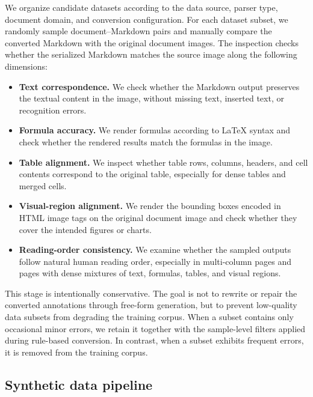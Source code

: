 We organize candidate datasets according to the data source, parser type, document domain, and conversion configuration. For each dataset subset, we randomly sample document--Markdown pairs and manually compare the converted Markdown with the original document images. The inspection checks whether the serialized Markdown matches the source image along the following dimensions:
\begin{itemize}
    \item \textbf{Text correspondence.}
    We check whether the Markdown output preserves the textual content in the image, without missing text, inserted text, or recognition errors.

    \item \textbf{Formula accuracy.}
    We render formulas according to LaTeX syntax and check whether the rendered results match the formulas in the image.

    \item \textbf{Table alignment.}
    We inspect whether table rows, columns, headers, and cell contents correspond to the original table, especially for dense tables and merged cells.

    \item \textbf{Visual-region alignment.}
    We render the bounding boxes encoded in HTML image tags on the original document image and check whether they cover the intended figures or charts.

    \item \textbf{Reading-order consistency.}
    We examine whether the sampled outputs follow natural human reading order, especially in multi-column pages and pages with dense mixtures of text, formulas, tables, and visual regions.
\end{itemize}

This stage is intentionally conservative. The goal is not to rewrite or repair the converted annotations through free-form generation, but to prevent low-quality data subsets from degrading the training corpus. When a subset contains only occasional minor errors, we retain it together with the sample-level filters applied during rule-based conversion. In contrast, when a subset exhibits frequent errors, it is removed from the training corpus.

\subsection{Synthetic data pipeline}

